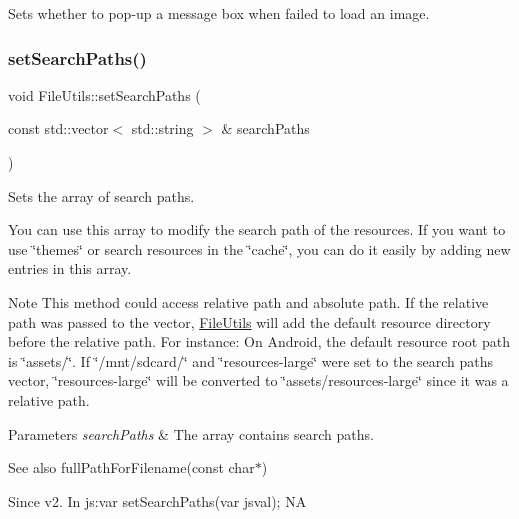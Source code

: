 Sets whether to pop-\/up a message box when failed to load an image. \mbox{\label{classFileUtils_a70336b604a6a9eb20dc56db8e8581a3d}} 
\subsubsection{\texorpdfstring{set\+Search\+Paths()}{setSearchPaths()}\hspace{0.1cm}{\footnotesize\ttfamily [1/2]}}
{\footnotesize\ttfamily void File\+Utils\+::set\+Search\+Paths (\begin{DoxyParamCaption}\item[{const std\+::vector$<$ std\+::string $>$ \&}]{search\+Paths }\end{DoxyParamCaption})\hspace{0.3cm}{\ttfamily [virtual]}}

Sets the array of search paths.

You can use this array to modify the search path of the resources. If you want to use \char`\"{}themes\char`\"{} or search resources in the \char`\"{}cache\char`\"{}, you can do it easily by adding new entries in this array.

\begin{DoxyNote}{Note}
This method could access relative path and absolute path. If the relative path was passed to the vector, \hyperlink{classFileUtils}{File\+Utils} will add the default resource directory before the relative path. For instance\+: On Android, the default resource root path is \char`\"{}assets/\char`\"{}. If \char`\"{}/mnt/sdcard/\char`\"{} and \char`\"{}resources-\/large\char`\"{} were set to the search paths vector, \char`\"{}resources-\/large\char`\"{} will be converted to \char`\"{}assets/resources-\/large\char`\"{} since it was a relative path.
\end{DoxyNote}

\begin{DoxyParams}{Parameters}
{\em search\+Paths} & The array contains search paths. \\
\hline
\end{DoxyParams}
\begin{DoxySeeAlso}{See also}
full\+Path\+For\+Filename(const char$\ast$) 
\end{DoxySeeAlso}
\begin{DoxySince}{Since}
v2. In js\+:var set\+Search\+Paths(var jsval);  NA 
\end{DoxySince}
\mbox{\label{classFileUtils_a40bd3826a4e4f49706179fc5e009a462}} 
